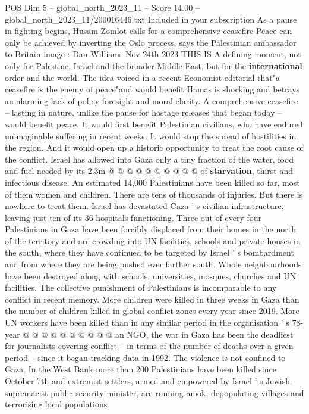 \begin{textsample}{POS Dim 5 – global\_north\_2023\_11 – Score 14.00 – global\_north\_2023\_11/200016446.txt}  \label{ex:f5_pos_413}
Included in your subscription As a pause in fighting begins, Husam Zomlot calls for a comprehensive ceasefire Peace can only be achieved by inverting the Oslo process, says the Palestinian ambassador to Britain image : Dan Williams Nov 24th 2023 THIS IS A defining moment, not only for Palestine, Israel and the broader Middle East, but for the \textbf{international} order and the world.
The idea voiced in a recent Economist editorial that"a ceasefire is the enemy of peace"and would benefit Hamas is shocking and betrays an alarming lack of policy foresight and moral clarity.
A comprehensive ceasefire -- lasting in nature, unlike the pause for hostage releases that began today -- would benefit peace.
It would first benefit Palestinian civilians, who have endured unimaginable suffering in recent weeks.
It would stop the spread of hostilities in the region.
And it would open up a historic opportunity to treat the root cause of the conflict.
Israel has allowed into Gaza only a tiny fraction of the water, food and fuel needed by its 2.3m @ @ @ @ @ @ @ @ @ @ of \textbf{starvation}, thirst and infectious disease.
An estimated 14,000 Palestinians have been killed so far, most of them women and children.
There are tens of thousands of injuries.
But there is nowhere to treat them.
Israel has devastated Gaza ' s civilian infrastructure, leaving just ten of its 36 hospitals functioning.
Three out of every four Palestinians in Gaza have been forcibly displaced from their homes in the north of the territory and are crowding into UN facilities, schools and private houses in the south, where they have continued to be targeted by Israel ' s bombardment and from where they are being pushed ever farther south.
Whole neighbourhoods have been destroyed along with schools, universities, mosques, churches and UN facilities.
The collective punishment of Palestinians is incomparable to any conflict in recent memory.
More children were killed in three weeks in Gaza than the number of children killed in global conflict zones every year since 2019.
More UN workers have been killed than in any similar period in the organisation ' s 78-year @ @ @ @ @ @ @ @ @ @ an NGO, the war in Gaza has been the deadliest for journalists covering conflict -- in terms of the number of deaths over a given period -- since it began tracking data in 1992.
The violence is not confined to Gaza.
In the West Bank more than 200 Palestinians have been killed since October 7th and extremist settlers, armed and empowered by Israel ' s Jewish-supremacist public-security minister, are running amok, depopulating villages and terrorising local populations.

\end{textsample}
